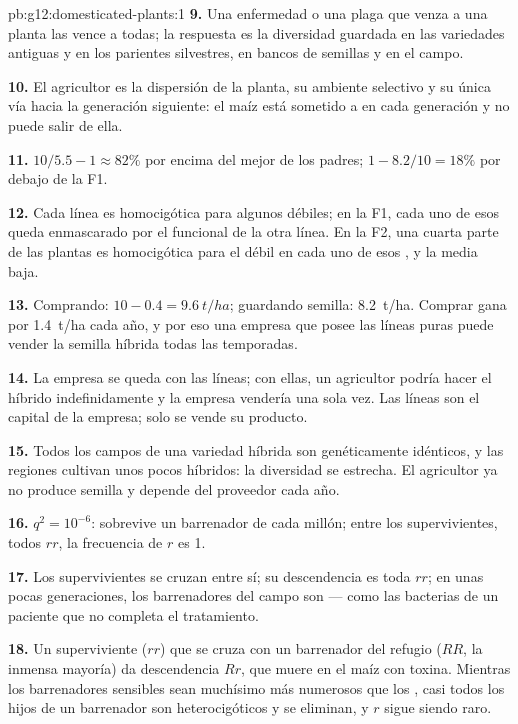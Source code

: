\begin{solution}{pb:g12:domesticated-plants:1}
\textbf{9.} Una enfermedad o una plaga que venza a una planta las vence
a todas; la respuesta es la diversidad guardada en las variedades
antiguas y en los parientes silvestres, en bancos de semillas y en el
campo.

\textbf{10.} El agricultor es la dispersión de la planta, su ambiente
selectivo y su única vía hacia la generación siguiente: el maíz está
sometido a  en cada generación y no puede salir de
ella.

\textbf{11.} $10/5.5 - 1 \approx 82\%$ por encima del mejor de los
padres; $1 - 8.2/10 = 18\%$ por debajo de la F1.

\textbf{12.} Cada línea es homocigótica para algunos  
débiles; en la F1, cada uno de esos  queda enmascarado por el
 funcional de la otra línea. En la F2, una cuarta parte de las
plantas es homocigótica para el  débil en cada uno de esos ,
y la media baja.

\textbf{13.} Comprando: $10 - 0.4 = \qty{9.6}{t/ha}$; guardando semilla:
\qty{8.2}{t/ha}. Comprar gana por \qty{1.4}{t/ha} cada año, y por eso
una empresa que posee las líneas puras puede vender la semilla híbrida
todas las temporadas.

\textbf{14.} La empresa se queda con las líneas; con ellas, un
agricultor podría hacer el híbrido indefinidamente y la empresa
vendería una sola vez. Las líneas son el capital de la empresa; solo se
vende su producto.

\textbf{15.} Todos los campos de una variedad híbrida son genéticamente
idénticos, y las regiones cultivan unos pocos híbridos: la diversidad
se estrecha. El agricultor ya no produce semilla y depende del
proveedor cada año.

\textbf{16.} $q^2 = 10^{-6}$: sobrevive un barrenador de cada millón;
entre los supervivientes, todos $rr$, la frecuencia de $r$ es 1.

\textbf{17.} Los supervivientes se cruzan entre sí; su descendencia es
toda $rr$; en unas pocas generaciones, los barrenadores del campo son
 --- como las bacterias de un paciente que no completa el
tratamiento.

\textbf{18.} Un superviviente  ($rr$) que se cruza con un
barrenador del refugio ($RR$, la inmensa mayoría) da descendencia $Rr$,
que muere en el maíz con toxina. Mientras los barrenadores sensibles
sean muchísimo más numerosos que los , casi todos los hijos
de un barrenador  son heterocigóticos y se eliminan, y $r$
sigue siendo raro.


\end{solution}

